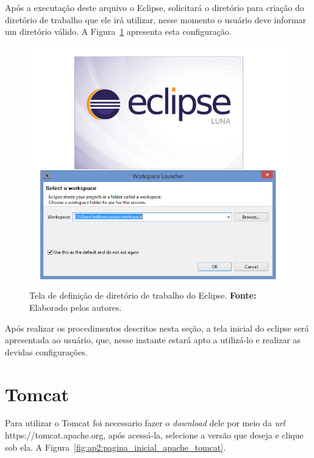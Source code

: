 Após a executação deste arquivo o Eclipse, solicitará o diretório para criação do diretório de trabalho que ele irá utilizar, nesse momento o usuário deve informar um diretório válido. A Figura~\ref{fig:ap2:eclipse_selecionar_workspace} apresenta esta configuração.

\captionsetup[figure]{list=no}
\begin{figure}[h!]
	\centerline{\includegraphics[scale=0.5]{./imagens/apendices/eclipse-selecionar-workspace.png}}
	\caption[Tela de definição de diretório de trabalho do Eclipse.]
	{Tela de definição de diretório de trabalho do Eclipse. \textbf{Fonte:} Elaborado pelos autores.}
	\label{fig:ap2:eclipse_selecionar_workspace}
\end{figure}

Após realizar os procedimentos descritos nesta seção, a tela inicial do eclipse será apresentada ao usuário, que, nesse instante estará apto a utilizá-lo e realizar as devidas configurações.

\section*{Tomcat}

Para utilizar o Tomcat foi necessario fazer o \textit{download} dele por meio da \textit{url} https://tomcat.apache.org, após acessá-la, selecione a versão que deseja e clique sob ela. A Figura~\ref{fig:ap2:pagina_inicial_apache_tomcat}.

